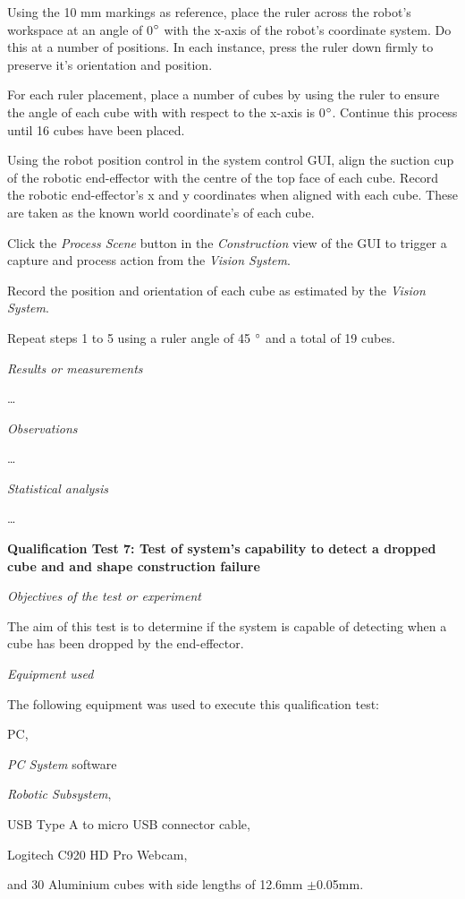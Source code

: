 \begin{compactenum}
	\item Using the 10 mm markings as reference, place the ruler across the robot's workspace at an angle of 0$^{\circ}$ with the x-axis of the robot's coordinate system. Do this at a number of positions. In each instance, press the ruler down firmly to preserve it's orientation and position.
	\item For each ruler placement, place a number of cubes by using the ruler to ensure the angle of each cube with with respect to the x-axis is 0$^{\circ}$. Continue this process until 16 cubes have been placed.
	\item Using the robot position control in the system control GUI, align the suction cup of the robotic end-effector with the centre of the top face of each cube. Record the robotic end-effector's x and y coordinates when aligned with each cube. These are taken as the known world coordinate's of each cube.
	\item Click the \textit{Process Scene} button in the \textit{Construction} view of the GUI to trigger a capture and process action from the \textit{Vision System}.
	\item Record the position and orientation of each cube as estimated by the \textit{Vision System}.
	\item Repeat steps 1 to 5 using a ruler angle of 45 $^{\circ}$ and a total of 19 cubes.
\end{compactenum}

\textit{Results or measurements}

\ldots

\textit{Observations}

\ldots

\textit{Statistical analysis}

\ldots

\textbf{Qualification Test 7: Test of system's capability to detect a dropped cube and and shape construction failure}

\textit{Objectives of the test or experiment}

The aim of this test is to determine if the system is capable of detecting when a cube has been dropped by the end-effector.

\textit{Equipment used}

The following equipment was used to execute this qualification test:

\begin{compactitem}
	\item PC,
	\item \textit{PC System} software
	\item \textit{Robotic Subsystem},
	\item USB Type A to micro USB connector cable,
	\item Logitech C920 HD Pro Webcam,
	\item and 30 Aluminium cubes with side lengths of 12.6mm $\pm$0.05mm.
\end{compactitem}

